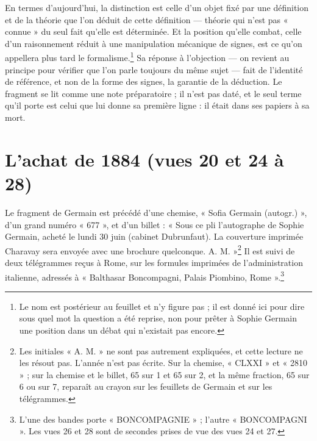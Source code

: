\documentclass[11pt,a4paper]{article}
\begin{document}
En termes d'aujourd'hui, la distinction est celle d'un objet fixé par une
définition et de la théorie que l'on déduit de cette définition — théorie qui
n'est pas « connue » du seul fait qu'elle est déterminée. Et la position
qu'elle combat, celle d'un raisonnement réduit à une manipulation mécanique de
signes, est ce qu'on appellera plus tard le formalisme.\footnote{Le nom est
postérieur au feuillet et n'y figure pas ; il est donné ici pour dire sous
quel mot la question a été reprise, non pour prêter à Sophie Germain une
position dans un débat qui n'existait pas encore.} Sa réponse à l'objection —
on revient au principe pour vérifier que l'on parle toujours du même sujet —
fait de l'identité de référence, et non de la forme des signes, la garantie de
la déduction. Le fragment se lit comme une note préparatoire ; il n'est pas
daté, et le seul terme qu'il porte est celui que lui donne sa première ligne :
il était dans ses papiers à sa mort.

\section*{L'achat de 1884 (vues 20 et 24 à 28)}

Le fragment de Germain est précédé d'une chemise, « Sofia Germain (autogr.) »,
d'un grand numéro « 677 », et d'un billet : « Sous ce pli l'autographe de
Sophie Germain, acheté le lundi 30 juin (cabinet Dubrunfaut). La couverture
imprimée Charavay sera envoyée avec une brochure quelconque. A. M. »\footnote{Les
initiales « A. M. » ne sont pas autrement expliquées, et cette lecture ne les
résout pas. L'année n'est pas écrite. Sur la chemise, « CLXXI » et « 2810 » ;
sur la chemise et le billet, 65 sur 1 et 65 sur 2, et la même fraction, 65
sur 6 ou sur 7, reparaît au crayon sur les feuillets de Germain et sur les
télégrammes.} Il est suivi de deux télégrammes reçus à Rome, sur les
formules imprimées de l'administration italienne, adressés à « Balthasar
Boncompagni, Palais Piombino, Rome ».\footnote{L'une des bandes porte
« BONCOMPAGNIE » ; l'autre « BONCOMPAGNI ». Les vues 26 et 28 sont de
secondes prises de vue des vues 24 et 27.}
\end{document}
